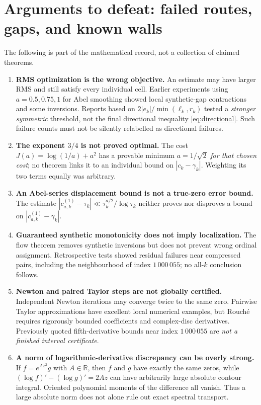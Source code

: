 \documentclass[11pt,a4paper]{article}
\numberwithin{equation}{section}
\newcommand{\R}{\mathbb R}
\newcommand{\status}[1]{\textbf{#1}}
\begin{document}
\appendix
\section{Arguments to defeat: failed routes, gaps, and known walls}
The following is part of the mathematical record, not a collection of claimed theorems.
\begin{enumerate}[leftmargin=*,itemsep=2.5pt]
\item \status{RMS optimization is the wrong objective.} An estimate may have larger RMS and still satisfy every individual cell. Earlier experiments using $a=0.5,0.75,1$ for Abel smoothing showed local synthetic-gap contractions and some inversions. Reports based on $2|e_k|/\min(\ell_k,r_k)$ tested a \emph{stronger symmetric} threshold, not the final directional inequality \eqref{eq:directional}. Such failure counts must not be silently relabelled as directional failures.
\item \status{The exponent $3/4$ is not proved optimal.} The cost $J(a)=\log(1/a)+a^2$ has a provable minimum $a=1/\sqrt2$ \emph{for that chosen cost}; no theorem links it to an individual bound on $|c_k-\gamma_k|$. Weighting its two terms equally was arbitrary.
\item \status{An Abel-series displacement bound is not a true-zero error bound.} The estimate $|c_{a,k}^{(1)}-\tau_k|\ll\tau_k^{a/2}/\log\tau_k$ neither proves nor disproves a bound on $|c_{a,k}^{(1)}-\gamma_k|$.
\item \status{Guaranteed synthetic monotonicity does not imply localization.} The flow theorem removes synthetic inversions but does not prevent wrong ordinal assignment. Retrospective tests showed residual failures near compressed pairs, including the neighbourhood of index $1\,000\,055$; no all-$k$ conclusion follows.
\item \status{Newton and paired Taylor steps are not globally certified.} Independent Newton iterations may converge twice to the same zero. Pairwise Taylor approximations have excellent local numerical examples, but Rouch\'e requires rigorously bounded coefficients and complex-disc derivatives. Previously quoted fifth-derivative bounds near index $1\,000\,055$ are \emph{not a finished interval certificate}.
\item \status{A norm of logarithmic-derivative discrepancy can be overly strong.} If $f=e^{Az^2}g$ with $A\in\R$, then $f$ and $g$ have exactly the same zeros, while $(\log f)'-(\log g)'=2Az$ can have arbitrarily large absolute contour integral. Oriented polynomial moments of the difference all vanish. Thus a large absolute norm does not alone rule out exact spectral transport.

\end{enumerate}
\end{document}
